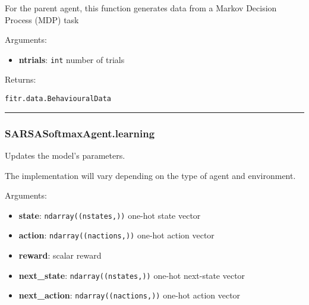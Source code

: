 \begin{Shaded}
\begin{Highlighting}[]
\end{Highlighting}
\end{Shaded}

For the parent agent, this function generates data from a Markov
Decision Process (MDP) task

Arguments:

\begin{itemize}
\tightlist
\item
  \textbf{ntrials}: \texttt{int} number of trials
\end{itemize}

Returns:

\texttt{fitr.data.BehaviouralData}

\begin{center}\rule{0.5\linewidth}{\linethickness}\end{center}

\subsubsection{SARSASoftmaxAgent.learning}\label{sarsasoftmaxagent.learning}

\begin{Shaded}
\begin{Highlighting}[]
\end{Highlighting}
\end{Shaded}

Updates the model's parameters.

The implementation will vary depending on the type of agent and
environment.

Arguments:

\begin{itemize}
\tightlist
\item
  \textbf{state}: \texttt{ndarray((nstates,))} one-hot state vector
\item
  \textbf{action}: \texttt{ndarray((nactions,))} one-hot action vector
\item
  \textbf{reward}: scalar reward
\item
  \textbf{next\_state}: \texttt{ndarray((nstates,))} one-hot next-state
  vector
\item
  \textbf{next\_action}: \texttt{ndarray((nactions,))} one-hot action
  vector
\end{itemize}

